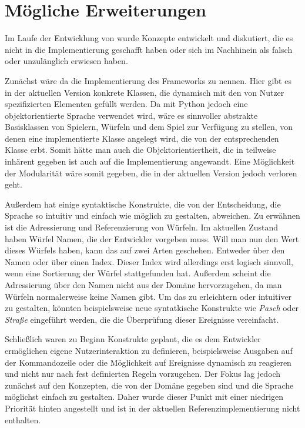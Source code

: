 \section{Mögliche Erweiterungen}
\label{sec:mogliche_erweiterungen}
	Im Laufe der Entwicklung von \dg wurde Konzepte entwickelt und diskutiert, die es nicht in die Implementierung geschafft haben oder sich im Nachhinein als falsch oder unzulänglich erwiesen haben.

	Zunächst wäre da die Implementierung des Frameworks zu nennen. Hier gibt es in der aktuellen Version konkrete Klassen, die dynamisch mit den von Nutzer spezifizierten Elementen gefüllt werden. Da mit Python jedoch eine objektorientierte Sprache verwendet wird, wäre es sinnvoller abstrakte Basisklassen von Spielern, Würfeln und dem Spiel zur Verfügung zu stellen, von denen eine implementierte Klasse angelegt wird, die von der entsprechenden Klasse erbt. Somit hätte man auch die Objektorientiertheit, die in \dg teilweise inhärent gegeben ist auch auf die Implementierung angewandt. Eine Möglichkeit der Modularität wäre somit gegeben, die in der aktuellen Version jedoch verloren geht.

	Außerdem hat \dg einige syntaktische Konstrukte, die von der Entscheidung, die Sprache so intuitiv und einfach wie möglich zu gestalten, abweichen. Zu erwähnen ist die Adressierung und Referenzierung von Würfeln. Im aktuellen Zustand haben Würfel Namen, die der Entwickler vorgeben muss. Will man nun den Wert dieses Würfels haben, kann das auf zwei Arten geschehen. Entweder über den Namen oder über einen Index. Dieser Index wird allerdings erst logisch sinnvoll, wenn eine Sortierung der Würfel stattgefunden hat. Außerdem scheint die Adressierung über den Namen nicht aus der Domäne hervorzugehen, da man Würfeln normalerweise keine Namen gibt. Um das zu erleichtern oder intuitiver zu gestalten, könnten beispielsweise neue syntatkische Konstrukte wie \emph{Pasch} oder \emph{Straße} eingeführt werden, die die Überprüfung dieser Ereignisse vereinfacht.

	Schließlich waren zu Beginn Konstrukte geplant, die es dem Entwickler ermöglichen eigene Nutzerinteraktion zu definieren, beispielsweise Ausgaben auf der Kommandozeile oder die Möglichkeit auf Ereignisse dynamisch zu reagieren und nicht nur nach fest definierten Regeln vorzugehen. Der Fokus lag jedoch zunächst auf den Konzepten, die von der Domäne gegeben sind und die Sprache möglichst einfach zu gestalten. Daher wurde dieser Punkt mit einer niedrigen Priorität hinten angestellt und ist in der aktuellen Referenzimplementierung nicht enthalten.